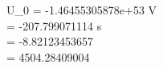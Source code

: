 U_0 = -1.46455305878e+53 V\\\tau = -207.799071114 s\\\varphi = -8.82123453657\\\omega = 4504.28409004\frac{}{\si{\second}}